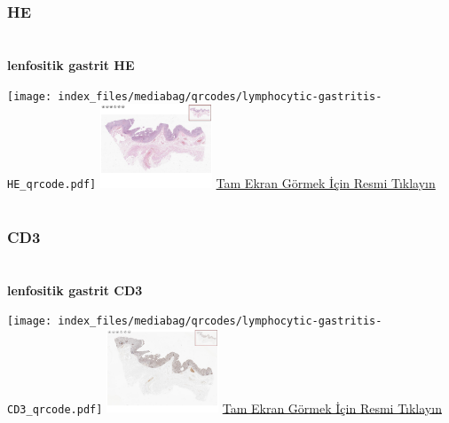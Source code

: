 \documentclass[
  letterpaper,
  DIV=11,
  numbers=noendperiod]{scrreprt}
\begin{document}
\hypertarget{he-8}{%
\subsection{HE}\label{he-8}}

\hypertarget{section-12}{%
\chapter{}\label{section-12}}

\textbf{lenfositik gastrit HE}

\texttt{[image: index\_files/mediabag/qrcodes/lymphocytic-gastritis-HE\_qrcode.pdf]}
\href{https://images.patolojiatlasi.com/lymphocytic-gastritis/HE.html}{\includegraphics[width=0.25\textwidth,height=\textheight]{./screenshots/thumbnail_lymphocytic-gastritisHE.png}}
\href{https://images.patolojiatlasi.com/lymphocytic-gastritis/HE.html}{Tam
Ekran Görmek İçin Resmi Tıklayın}

\hypertarget{section-13}{%
\chapter{}\label{section-13}}

\hypertarget{cd3}{%
\subsection{CD3}\label{cd3}}

\hypertarget{section-14}{%
\chapter{}\label{section-14}}

\textbf{lenfositik gastrit CD3}

\texttt{[image: index\_files/mediabag/qrcodes/lymphocytic-gastritis-CD3\_qrcode.pdf]}
\href{https://images.patolojiatlasi.com/lymphocytic-gastritis/CD3.html}{\includegraphics[width=0.25\textwidth,height=\textheight]{./screenshots/thumbnail_lymphocytic-gastritisCD3.png}}
\href{https://images.patolojiatlasi.com/lymphocytic-gastritis/CD3.html}{Tam
Ekran Görmek İçin Resmi Tıklayın}
\end{document}
